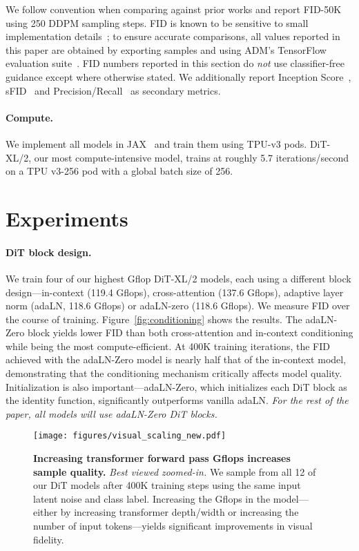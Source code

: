 \documentclass[10pt,twocolumn,letterpaper]{article}
\begin{document}
\noindent We follow convention when comparing against prior works and report FID-50K using 250 DDPM sampling steps. FID is known to be sensitive to small implementation details~\cite{parmar2021cleanfid}; to ensure accurate comparisons, all values reported in this paper are obtained by exporting samples and using ADM's TensorFlow evaluation suite~\cite{dhariwal2021adm}. FID numbers reported in this section do \textit{not} use classifier-free guidance except where otherwise stated. We additionally report Inception Score~\cite{salimans2016gans}, sFID~\cite{nash2021generating} and Precision/Recall~\cite{kynkaanniemi2019improved} as secondary metrics.
\paragraph{Compute.} We implement all models in JAX~\cite{jax2018github} and train them using TPU-v3 pods. DiT-XL/2, our most compute-intensive model, trains at roughly 5.7 iterations/second on a TPU v3-256 pod with a global batch size of 256. 

\section{Experiments}\label{sec:experiments}

\paragraph{DiT block design.} We train four of our highest Gflop DiT-XL/2 models, each using a different block design---in-context (119.4 Gflops), cross-attention (137.6 Gflops), adaptive layer norm (adaLN, 118.6 Gflops) or adaLN-zero (118.6 Gflops). We measure FID over the course of training. Figure~\ref{fig:conditioning} shows the results. The adaLN-Zero block yields lower FID than both cross-attention and in-context conditioning while being the most compute-efficient. At 400K training iterations, the FID achieved with the adaLN-Zero model is nearly half that of the in-context model, demonstrating that the conditioning mechanism critically affects model quality. Initialization is also important---adaLN-Zero, which initializes each DiT block as the identity function, significantly outperforms vanilla adaLN. \textit{For the rest of the paper, all models will use adaLN-Zero DiT blocks.}

\begin{figure*}\centering\vspace{-4mm}\texttt{[image: figures/visual\_scaling\_new.pdf]}
\vspace{-2mm}
\caption{\textbf{Increasing transformer forward pass Gflops increases sample quality.} \textit{Best viewed zoomed-in.} We sample from all 12 of our DiT models after 400K training steps using the same input latent noise and class label. Increasing the Gflops in the model---either by increasing transformer depth/width or increasing the number of input tokens---yields significant improvements in visual fidelity.}
\label{fig:visual_scaling}
\end{figure*}
\end{document}

